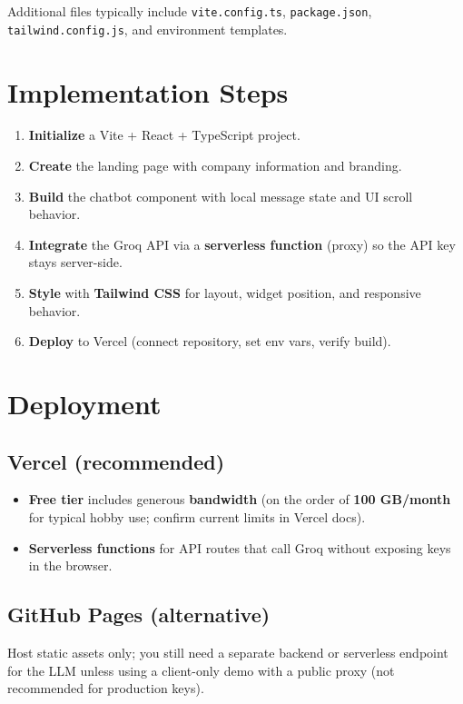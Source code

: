 \documentclass{article}
\begin{document}
Additional files typically include \texttt{vite.config.ts}, \texttt{package.json}, \texttt{tailwind.config.js}, and environment templates.

\section{Implementation Steps}

\begin{enumerate}[leftmargin=*]
  \item \textbf{Initialize} a Vite + React + TypeScript project.
  \item \textbf{Create} the landing page with company information and branding.
  \item \textbf{Build} the chatbot component with local message state and UI scroll behavior.
  \item \textbf{Integrate} the Groq API via a \textbf{serverless function} (proxy) so the API key stays server-side.
  \item \textbf{Style} with \textbf{Tailwind CSS} for layout, widget position, and responsive behavior.
  \item \textbf{Deploy} to Vercel (connect repository, set env vars, verify build).
\end{enumerate}

\section{Deployment}

\subsection{Vercel (recommended)}

\begin{itemize}[leftmargin=*]
  \item \textbf{Free tier} includes generous \textbf{bandwidth} (on the order of \textbf{100 GB/month} for typical hobby use; confirm current limits in Vercel docs).
  \item \textbf{Serverless functions} for API routes that call Groq without exposing keys in the browser.
\end{itemize}

\subsection{GitHub Pages (alternative)}

Host static assets only; you still need a separate backend or serverless endpoint for the LLM unless using a client-only demo with a public proxy (not recommended for production keys).
\end{document}
